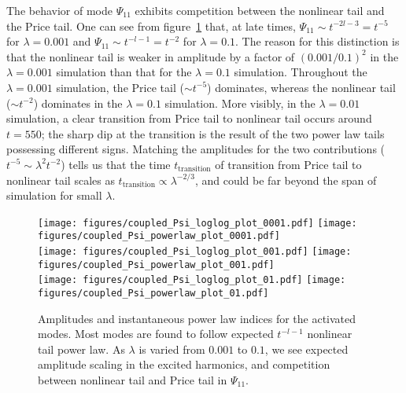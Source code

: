 \documentclass[reprint,aps,physrev,superscriptaddress,10pt,notitlepage,prd,nofootinbib,onecolumn]{revtex4-2}
\newcommand{\fref}[1]{figure~\ref{#1}}
\begin{document}
The behavior of mode $\Psi_{11}$ exhibits competition between the nonlinear tail and the Price tail.
One can see from \fref{fig:coupled_Psi_evolution_plot} that, at late times, $\Psi_{11} \sim t^{-2l-3} = t^{-5}$ for $\lambda = 0.001$ and $\Psi_{11} \sim t^{-l-1} = t^{-2}$ for $\lambda = 0.1$.
The reason for this distinction is that the nonlinear tail is weaker in amplitude by a factor of $(0.001 / 0.1)^2$ in the $\lambda = 0.001$ simulation than that for the $\lambda = 0.1$ simulation.
Throughout the $\lambda = 0.001$ simulation, the Price tail ($\sim t^{-5}$) dominates, whereas the nonlinear tail ($\sim t^{-2}$) dominates in the $\lambda = 0.1$ simulation.
More visibly, in the $\lambda = 0.01$ simulation, a clear transition from Price tail to nonlinear tail occurs around $t=550$; the sharp dip at the transition is the result of the two power law tails possessing different signs.
Matching the amplitudes for the two contributions ($t^{-5} \sim \lambda^2 t^{-2}$) tells us that the time $t_{\mathrm{transition}}$ of transition from Price tail to nonlinear tail scales as $t_{\mathrm{transition}} \propto \lambda^{-2/3}$, and could be far beyond the span of simulation for small $\lambda$.

\begin{figure}[t]
  \centering
  \texttt{[image: figures/coupled\_Psi\_loglog\_plot\_0001.pdf]}
  \texttt{[image: figures/coupled\_Psi\_powerlaw\_plot\_0001.pdf]}\\
  \texttt{[image: figures/coupled\_Psi\_loglog\_plot\_001.pdf]}
  \texttt{[image: figures/coupled\_Psi\_powerlaw\_plot\_001.pdf]}\\
  \texttt{[image: figures/coupled\_Psi\_loglog\_plot\_01.pdf]}
  \texttt{[image: figures/coupled\_Psi\_powerlaw\_plot\_01.pdf]}
  \caption{Amplitudes and instantaneous power law indices for the activated modes.
    Most modes are found to follow expected $t^{-l-1}$ nonlinear tail power law.
    As $\lambda$ is varied from $0.001$ to $0.1$, we see expected amplitude scaling in the excited harmonics, and competition between nonlinear tail and Price tail in $\Psi_{11}$.}
  \label{fig:coupled_Psi_evolution_plot}
\end{figure}
\end{document}
